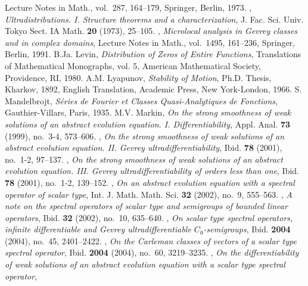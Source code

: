 \documentclass{amsart}
\theoremstyle{plain}
\theoremstyle{definition}
\begin{document}
\begin{thebibliography}{99}
{Lecture Notes in Math.},	
{vol.~287},	
{164--179},	
{Springer},	
{Berlin},		
{1973}.		
{\bysame},	
\textit{Ultradistributions. I. Structure theorems and a characterization},	
{J. Fac. Sci. Univ. Tokyo Sect. IA Math.}	
\textbf{20}	
{(1973)},	
{25--105}.	
{\bysame},	
\textit{Microlocal analysis in Gevrey classes and in complex domains},	
{Lecture Notes in Math.},	
{vol.~1495},	
{161--236},	
{Springer},	
{Berlin},		
{1991}.		
{B.Ja. Levin},	
\textit{Distribution of Zeros of Entire Functions}, 
{Translations of Mathematical Monographs, vol. 5},	
{American Mathematical Society},	
{Providence, RI},		
{1980}.		
{A.M. Lyapunov},	
\textit{Stability of Motion},	
{Ph.D. Thesis},	
{Kharkov},	
{1892},		
{English Translation},	
{Academic Press},	
{New York-London},		
{1966}.	
{S. Mandelbrojt},	
\textit{S\'eries de Fourier et Classes Quasi-Analytiques de Fonctions},	
{Gauthier-Villars},	
{Paris},		
{1935}.		
{M.V. Markin},	
\textit{On the strong smoothness of weak solutions of an abstract evolution equation. I. Differentiability},	
{Appl. Anal.}	
\textbf{73}	
{(1999)},	
{no.~3-4},	
{573--606}.	
{\bysame},	
\textit{On the strong smoothness of weak solutions of an abstract evolution equation. II. Gevrey ultra\-differentiability}, 
{Ibid.}	
\textbf{78}	
{(2001)},	
{no.~1-2},	
{97--137}.	
{\bysame},	
\textit{On the strong smoothness of weak solutions of an abstract evolution equation. III. Gevrey ultradifferentiability of orders less than one}, 
{Ibid.}	
\textbf{78}	
{(2001)},	
{no.~1-2},	
{139--152}.	
{\bysame},	
\textit{On an abstract evolution equation with a spectral operator of scalar type},	
{Int. J. Math. Math. Sci.}	
\textbf{32}	
{(2002)},	
{no.~9},	
{555--563}.	
{\bysame},	
\textit{A note on the spectral operators of scalar type and semigroups of bounded linear operators},	
{Ibid.}	
\textbf{32}	
{(2002)},	
{no.~10},	
{635--640}.	
{\bysame},	
\textit{On scalar type spectral operators, infinite differentiable and Gevrey ultradifferentiable $C_0$-semigroups},	
{Ibid.}	
\textbf{2004}	
{(2004)},	
{no.~45},	
{2401--2422}.	
{\bysame},	
\textit{On the Carleman classes of vectors of a scalar type spectral operator},	
{Ibid.}	
\textbf{2004}	
{(2004)},	
{no.~60},	
{3219--3235}.	
{\bysame},	
\textit{On the differentiability of weak solutions of an abstract evolution equation with a scalar type spectral operator},	

\end{thebibliography}
\end{document}
